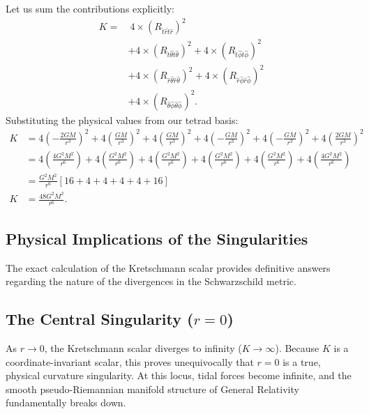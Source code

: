 \documentclass[11pt, a4paper]{report}
\begin{document}
Let us sum the contributions explicitly:
\begin{align}
K =& \ 4 \times (R_{\hat{t}\hat{r}\hat{t}\hat{r}})^{2} \nonumber \\
&+ 4 \times (R_{\hat{t}\hat{\theta}\hat{t}\hat{\theta}})^{2} + 4 \times (R_{\hat{t}\hat{\phi}\hat{t}\hat{\phi}})^{2} \nonumber \\
&+ 4 \times (R_{\hat{r}\hat{\theta}\hat{r}\hat{\theta}})^{2} + 4 \times (R_{\hat{r}\hat{\phi}\hat{r}\hat{\phi}})^{2} \nonumber \\
&+ 4 \times (R_{\hat{\theta}\hat{\phi}\hat{\theta}\hat{\phi}})^{2}.
\end{align}
Substituting the physical values from our tetrad basis:
\begin{align}
K &= 4\left(-\frac{2GM}{r^{3}}\right)^{2} + 4\left(\frac{GM}{r^{3}}\right)^{2} + 4\left(\frac{GM}{r^{3}}\right)^{2} + 4\left(-\frac{GM}{r^{3}}\right)^{2} + 4\left(-\frac{GM}{r^{3}}\right)^{2} + 4\left(\frac{2GM}{r^{3}}\right)^{2} \nonumber \\
&= 4\left(\frac{4G^{2}M^{2}}{r^{6}}\right) + 4\left(\frac{G^{2}M^{2}}{r^{6}}\right) + 4\left(\frac{G^{2}M^{2}}{r^{6}}\right) + 4\left(\frac{G^{2}M^{2}}{r^{6}}\right) + 4\left(\frac{G^{2}M^{2}}{r^{6}}\right) + 4\left(\frac{4G^{2}M^{2}}{r^{6}}\right) \nonumber \\
&= \frac{G^{2}M^{2}}{r^{6}} \left[ 16 + 4 + 4 + 4 + 4 + 16 \right] \nonumber \\
K &= \frac{48G^{2}M^{2}}{r^{6}}.
\end{align}

\subsection{Physical Implications of the Singularities}

The exact calculation of the Kretschmann scalar provides definitive answers regarding the nature of the divergences in the Schwarzschild metric.

\subsection{The Central Singularity ($r=0$)}
As $r \to 0$, the Kretschmann scalar diverges to infinity ($K \to \infty$). Because $K$ is a coordinate-invariant scalar, this proves unequivocally that $r=0$ is a true, physical curvature singularity. At this locus, tidal forces become infinite, and the smooth pseudo-Riemannian manifold structure of General Relativity fundamentally breaks down.
\end{document}
